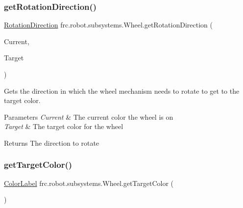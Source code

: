 \subsubsection{\texorpdfstring{getRotationDirection()}{getRotationDirection()}}
{\footnotesize\ttfamily \mbox{\hyperlink{enumfrc_1_1robot_1_1enums_1_1_rotation_direction}{Rotation\+Direction}} frc.\+robot.\+subsystems.\+Wheel.\+get\+Rotation\+Direction (\begin{DoxyParamCaption}\item[{\mbox{\hyperlink{enumfrc_1_1robot_1_1enums_1_1_color_label}{Color\+Label}}}]{Current,  }\item[{\mbox{\hyperlink{enumfrc_1_1robot_1_1enums_1_1_color_label}{Color\+Label}}}]{Target }\end{DoxyParamCaption})\hspace{0.3cm}{\ttfamily [inline]}}



Gets the direction in which the wheel mechanism needs to rotate to get to the target color. 


\begin{DoxyParams}{Parameters}
{\em Current} & The current color the wheel is on \\
\hline
{\em Target} & The target color for the wheel \\
\hline
\end{DoxyParams}
\begin{DoxyReturn}{Returns}
The direction to rotate 
\end{DoxyReturn}
\mbox{\label{classfrc_1_1robot_1_1subsystems_1_1_wheel_a0b2f59c04fb658942ff3c7d60a66d4d2}} 
\subsubsection{\texorpdfstring{getTargetColor()}{getTargetColor()}}
{\footnotesize\ttfamily \mbox{\hyperlink{enumfrc_1_1robot_1_1enums_1_1_color_label}{Color\+Label}} frc.\+robot.\+subsystems.\+Wheel.\+get\+Target\+Color (\begin{DoxyParamCaption}{ }\end{DoxyParamCaption})\hspace{0.3cm}{\ttfamily [inline]}}



